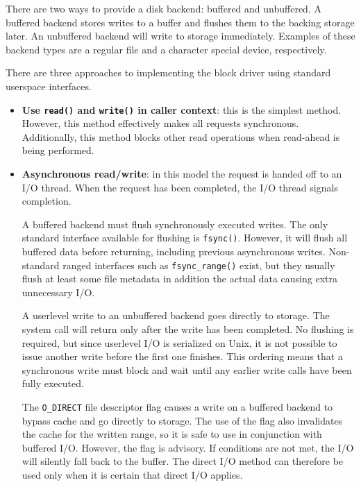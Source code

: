 There are two ways to provide a disk backend: buffered and unbuffered.
A buffered backend stores writes to a buffer and flushes them to the
backing storage later.  An unbuffered backend will write to storage
immediately.  Examples of these backend types are a regular file and a
character special device, respectively.

There are three approaches to implementing the block driver
using standard userspace interfaces.
\begin{itemize}
\item   \textbf{Use \texttt{read()} and \texttt{write()}
	in caller context}: this is the simplest method.  However,
	this method effectively makes all requests synchronous.
	Additionally, this method blocks other read
	operations when read-ahead is being performed.

\item   \textbf{Asynchronous read/write}: in this model the request is
        handed off to an I/O thread.  When the request has been
        completed, the I/O thread signals completion.

        A buffered backend must flush synchronously executed
        writes.  The only standard interface available for flushing
        is \texttt{fsync()}.  However, it will flush all buffered
        data before returning, including previous asynchronous
        writes.  Non-standard ranged interfaces such as
        \verb+fsync_range()+ exist, but they usually flush at least
        some file metadata in addition the actual data causing
        extra unnecessary I/O.

        A userlevel write to an unbuffered backend goes directly
        to storage.  The system call will return only after the
        write has been completed.  No flushing is required, but
        since userlevel I/O is serialized on Unix, it is not possible
        to issue another write before the first one finishes.  This
        ordering means that a synchronous write must block and wait until
        any earlier write calls have been fully executed.

        The \verb+O_DIRECT+ file descriptor flag causes a write on
        a buffered backend to bypass cache and go directly to
        storage.  The use of the flag also invalidates the cache
        for the written range, so it is safe to use in conjunction
	with buffered I/O.  However, the flag is advisory.  If
	conditions are not met, the I/O will silently fall back to
	the buffer.  The direct I/O method can therefore be used only
	when it is certain that direct I/O applies.


\end{itemize}
